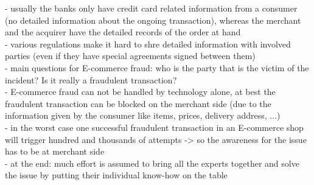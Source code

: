 - usually the banks only have credit card related information from a consumer (no detailed information about the ongoing transaction), whereas the merchant and the acquirer have the detailed records of the order at hand \\
- various regulations make it hard to shre detailed information with involved parties (even if they have special agreements signed between them) \\
- main questions for E-commerce fraud: who is the party that is the victim of the incident? Is it really a fraudulent transaction? \\
- E-commerce fraud can not be handled by technology alone, at best the fraudulent transaction can be blocked on the merchant side (due to the information given by the consumer like items, prices, delivery address, ...) \\
- in the worst case one successful fraudulent transaction in an E-commerce shop will trigger hundred and thousands of attempts -> so the awareness for the issue has to be at merchant side \\
- at the end: much effort is assumed to bring all the experts together and solve the issue by putting their individual know-how on the table \\


